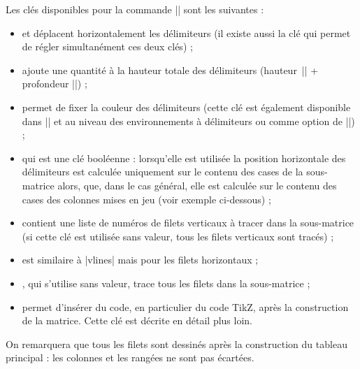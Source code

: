 \documentclass[dvipsnames]{article}%
\begin{document}
\bigskip
Les clés disponibles pour la commande |\SubMatrix| sont les suivantes :
%
\begin{itemize}
\item 
{}
 et  déplacent
horizontalement les délimiteurs (il existe aussi la clé  qui
permet de régler simultanément ces deux clés) ;
\item {}
 ajoute une quantité à la hauteur totale des
délimiteurs (hauteur~|\ht| + profondeur |\dp|) ;
\item {}
 permet de fixer la couleur des délimiteurs (cette clé
est également disponible dans |\NiceMatrixOptions| et au niveau des
environnements à délimiteurs ou comme option de |\CodeAfter|) ;
\item {}
 qui est une clé booléenne : lorsqu'elle est utilisée la position
horizontale des délimiteurs est calculée uniquement sur le contenu des cases
de la sous-matrice alors, que, dans le cas général, elle est calculée sur le
contenu des cases des colonnes mises en jeu (voir exemple ci-dessous) ;
\item {}
 contient une liste de numéros de filets verticaux à tracer dans
la sous-matrice (si cette clé est utilisée sans valeur, tous les filets
verticaux sont tracés) ;
\item {}
 est similaire à |vlines| mais pour les filets horizontaux ;
\item {}
, qui s'utilise sans valeur, trace tous les filets dans la
sous-matrice ;
\item {}
 permet d'insérer du code, en particulier du code TikZ, après la
construction de la matrice. Cette clé est décrite en détail plus loin.
\end{itemize}
On remarquera que tous les filets sont dessinés après la construction du tableau
principal : les colonnes et les rangées ne sont pas écartées.
\end{document}
